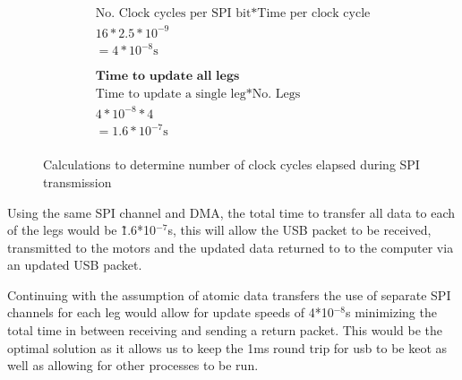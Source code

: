 \begin{figure}[!t]
\begin{minipage}{0.5\textwidth}
\begin{gather*}
    		    	\text{No. Clock cycles per SPI bit} * \text{Time per clock cycle}\\
    		    	16 * 2.5*10^{-9}\\
    		    	=4*10^{-8}\text{s}\\
    		    	\\
    		    	\\
    		    	\textbf{Time to update all legs}\\
    		    	\text{Time to update a single leg} * \text{No. Legs}\\
    		    	4*10^{-8}* 4\\
    		        =1.6*10^{-7}\text{s}\\
    			\end{gather*}  
			\end{minipage}
			\caption{Calculations to determine number of clock cycles elapsed during SPI transmission}
   			\label{fig:SPIClockCycles}
   		    \end{figure}

			Using the same SPI channel and DMA, the total time to transfer all data to each of the legs would be \~ 1.6*10$^{-7}$s, this will allow the USB packet to be received, transmitted to the motors and the updated data returned to to the computer via an updated USB packet. \newline
		
		Continuing with the assumption of atomic data transfers the use of separate SPI channels for each leg would allow for update speeds of 4*10$^{-8}$s minimizing the total time in between receiving and sending a return packet. This would be the optimal solution as it allows us to keep the 1ms round trip for usb to be keot as well as allowing for other processes to be run.  
		
